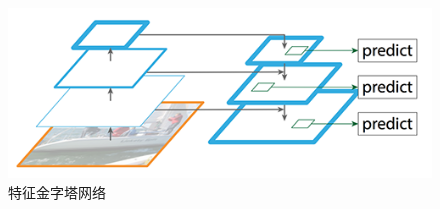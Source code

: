 \begin{figure}[h]
  \centering
  \includegraphics[width=0.75\linewidth]{Img/fpn.png}
  \caption{特征金字塔网络\cite{lin2017feature}}
  \label{fig:fpn}
\end{figure}

